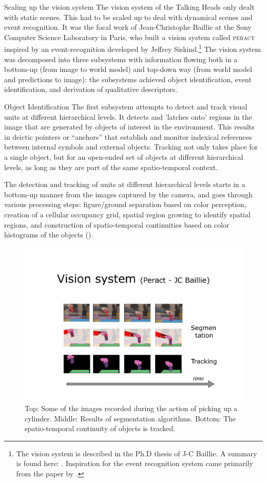 {\bfshape  Scaling up the vision system} 
The vision system of the Talking Heads only dealt with static scenes. This had to be scaled up to
deal with dynamical scenes and event recognition. It was the focal work of 
Jean-Christophe Baillie at the Sony Computer Science Laboratory in Paris, who built a vision system 
called \textsc{peract}  inspired by an event-recognition developed by Jeffrey 
Siskind.\footnote{The vision system is described in the Ph.D thesis of J-C Baillie. A summary is found here: 
\cite{Steels:2003}. Inspiration for the event recognition system came 
primarily from the paper by \cite{Siskind:2000}.}
The vision system was decomposed into three subsystems with information flowing both in a bottom-up
(from image to world model) and top-down way (from world model and predictions to image): the subsystems achieved 
object identification, event identification, and derivation of qualitative descriptors. 

{\bfshape  Object Identification} The first subsystem attempts to detect and track visual units at different hierarchical levels. 
It detects and 'latches onto' regions in the image that are generated by objects of 
interest in the environment. This results in deictic pointers or ``anchors'' that establish and monitor indexical references 
between internal symbols and external objects. Tracking not only takes place for a single object, but for 
an open-ended set of objects at different hierarchical levels, as long as they are part of the same spatio-temporal context. 

The detection and tracking of units at different hierarchical levels starts in a bottom-up manner from the images captured by the camera, and goes through various processing steps: figure/ground separation based on color perception, creation of a cellular occupancy grid, spatial region growing to identify spatial regions, and construction of spatio-temporal continuities based on 
color histograms of the objects (). 

\begin{figure}[htbp]
  \centerline{\includegraphics[width=.80\textwidth]{chap10/figs/PERACT-images.pdf}}
\caption{\label{fig:PERACT-images}Top: Some of the images recorded during the action of picking up a cylinder. 
Middle: Results of segmentation algorithms. 
Bottom: The spatio-temporal continuity of objects is tracked. 
}
\end{figure}

